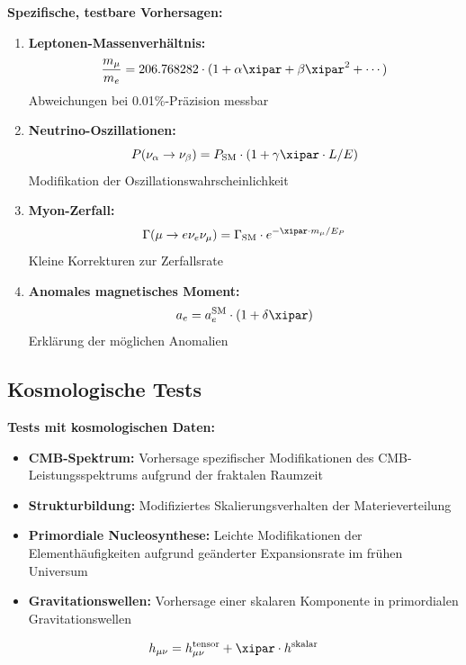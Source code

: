 	\begin{anwendung}
		\textbf{Spezifische, testbare Vorhersagen:}
		
		\begin{enumerate}
			\item \textbf{Leptonen-Massenverhältnis:}
			\begin{equation}
				\frac{m_\mu}{m_e} = 206.768282 \cdot (1 + \alpha \xipar + \beta \xipar^2 + \cdots)
			\end{equation}
			Abweichungen bei 0.01\%-Präzision messbar
			
			\item \textbf{Neutrino-Oszillationen:}
			\begin{equation}
				P(\nu_\alpha \to \nu_\beta) = P_{\text{SM}} \cdot (1 + \gamma \xipar \cdot L/E)
			\end{equation}
			Modifikation der Oszillationswahrscheinlichkeit
			
			\item \textbf{Myon-Zerfall:}
			\begin{equation}
				\Gamma(\mu \to e\nu_e\nu_\mu) = \Gamma_{\text{SM}} \cdot e^{-\xipar \cdot m_\mu/E_P}
			\end{equation}
			Kleine Korrekturen zur Zerfallsrate
			
			\item \textbf{Anomales magnetisches Moment:}
			\begin{equation}
				a_e = a_e^{\text{SM}} \cdot (1 + \delta \xipar)
			\end{equation}
			Erklärung der möglichen Anomalien
		\end{enumerate}
	\end{anwendung}
	
	\subsection{Kosmologische Tests}
	
	\begin{anwendung}
		\textbf{Tests mit kosmologischen Daten:}
		
		\begin{itemize}
			\item \textbf{CMB-Spektrum:} Vorhersage spezifischer Modifikationen des CMB-Leistungsspektrums aufgrund der fraktalen Raumzeit
			
			\item \textbf{Strukturbildung:} Modifiziertes Skalierungsverhalten der Materieverteilung
			
			\item \textbf{Primordiale Nucleosynthese:} Leichte Modifikationen der Elementhäufigkeiten aufgrund geänderter Expansionsrate im frühen Universum
			
			\item \textbf{Gravitationswellen:} Vorhersage einer skalaren Komponente in primordialen Gravitationswellen
		\end{itemize}
		
		\begin{equation}
			h_{\mu\nu} = h_{\mu\nu}^{\text{tensor}} + \xipar \cdot h^{\text{skalar}}
		\end{equation}
	\end{anwendung}
	
